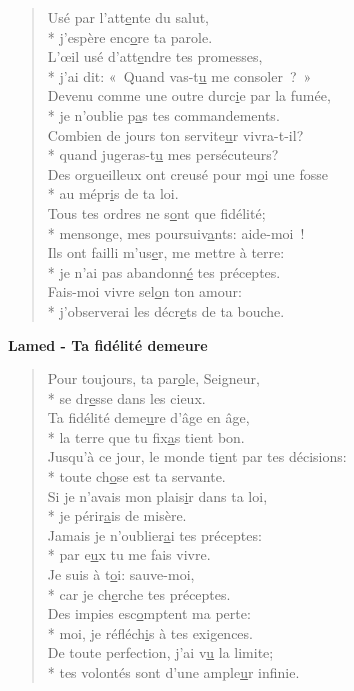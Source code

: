 \begin{verse}
Usé par l’att\underline{e}nte du salut, \\*
j’espère enc\underline{o}re ta parole. \\
L’œil usé d’att\underline{e}ndre tes promesses, \\*
j’ai dit: « Quand vas-t\underline{u} me consoler ? » \\
Devenu comme une outre durc\underline{i}e par la fumée, \\*
je n’oublie p\underline{a}s tes commandements. \\
Combien de jours ton servite\underline{u}r vivra-t-il? \\*
quand jugeras-t\underline{u} mes persécuteurs? \\
Des orgueilleux ont creusé pour m\underline{o}i une fosse \\*
au mépr\underline{i}s de ta loi. \\
Tous tes ordres ne s\underline{o}nt que fidélité; \\*
mensonge, mes poursuiv\underline{a}nts: aide-moi ! \\
Ils ont failli m’us\underline{e}r, me mettre à terre: \\*
je n’ai pas abandonn\underline{é} tes préceptes. \\
Fais-moi vivre sel\underline{o}n ton amour: \\*
j’observerai les décr\underline{e}ts de ta bouche. \\
\end{verse}
\textbf{Lamed - Ta fidélité demeure}
\begin{verse}
Pour toujours, ta par\underline{o}le, Seigneur, \\*
se dr\underline{e}sse dans les cieux. \\
Ta fidélité deme\underline{u}re d’âge en âge, \\*
la terre que tu fix\underline{a}s tient bon. \\
Jusqu’à ce jour, le monde ti\underline{e}nt par tes décisions: \\*
toute ch\underline{o}se est ta servante. \\
Si je n’avais mon plais\underline{i}r dans ta loi, \\*
je périr\underline{a}is de misère. \\
Jamais je n’oublier\underline{a}i tes préceptes: \\*
par e\underline{u}x tu me fais vivre. \\
Je suis à t\underline{o}i: sauve-moi, \\*
car je ch\underline{e}rche tes préceptes. \\
Des impies esc\underline{o}mptent ma perte: \\*
moi, je réfléch\underline{i}s à tes exigences. \\
De toute perfection, j’ai v\underline{u} la limite; \\*
tes volontés sont d’une ample\underline{u}r infinie. \\
\end{verse}
